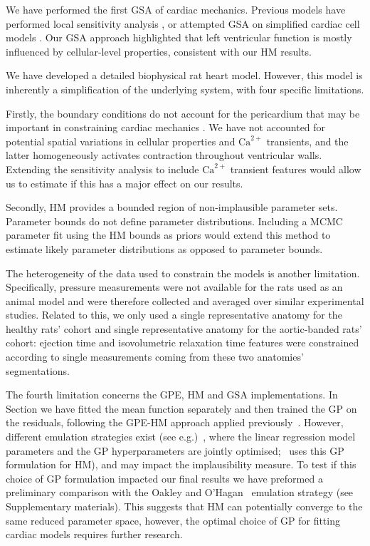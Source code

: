 We have performed the first GSA of cardiac mechanics. Previous models have performed local sensitivity analysis \cite{Sher:2013}, or attempted GSA on simplified cardiac cell models \cite{Pathmanathan:2019}. Our GSA approach highlighted that left ventricular function is mostly influenced by cellular-level properties, consistent with our HM results.

\vspace{0.2cm}\noindent
{}

\noindent
We have developed a detailed biophysical rat heart model. However, this model is inherently a simplification of the underlying system, with four specific limitations.

Firstly, the boundary conditions do not account for the pericardium that may be important in constraining cardiac mechanics \cite{Strocchi:2020}. We have not accounted for potential spatial variations in cellular properties and $\textrm{Ca}^{2+}$ transients, and the latter homogeneously activates contraction throughout ventricular walls. Extending the sensitivity analysis to include $\textrm{Ca}^{2+}$ transient features would allow us to estimate if this has a major effect on our results.

Secondly, HM provides a bounded region of non-implausible parameter sets. Parameter bounds do not define parameter distributions. Including a MCMC parameter fit using the HM bounds as priors would extend this method to estimate likely parameter distributions as opposed to parameter bounds.

The heterogeneity of the data used to constrain the models is another limitation. Specifically, pressure measurements were not available for the rats used as an animal model and were therefore collected and averaged over similar experimental studies. Related to this, we only used a single representative anatomy for the healthy rats' cohort and single representative anatomy for the aortic-banded rats' cohort: ejection time and isovolumetric relaxation time features were constrained according to single measurements coming from these two anatomies' segmentations.

The fourth limitation concerns the GPE, HM and GSA implementations. In Section we have fitted the mean function separately and then trained the GP on the residuals, following the GPE-HM approach applied previously~\cite{Salter:2016,Vernon:2018}. However, different emulation strategies exist (see e.g.)~\cite{Oakley:2004}, where the linear regression model parameters and the GP hyperparameters are jointly optimised;~\cite{Coveney:2018} uses this GP formulation for HM), and may impact the implausibility measure. To test if this choice of GP formulation impacted our final results we have preformed a preliminary comparison with the Oakley and O'Hagan~\cite{Oakley:2004} emulation strategy (see Supplementary materials). This suggests that HM can potentially converge to the same reduced parameter space, however, the optimal choice of GP for fitting cardiac models requires further research.

